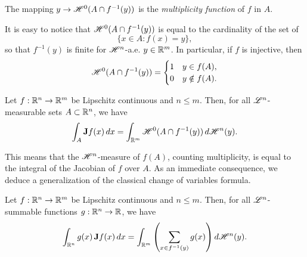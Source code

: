 \begin{definition}
The mapping $y \to \mathscr{H}^{0}(A \cap f^{-1}(y))$ is the {\em multiplicity function} of $f$ in $A$.
\end{definition}

\begin{remark}
It is easy to notice that $\mathscr{H}^{0}(A \cap f^{-1}(y))$ is equal to the cardinality of the set of $$\{ x \in A : f(x) = y \},$$
so that $f^{-1}(y)$ is finite for $\mathscr{H}^{n}$-a.e. $y \in \mathbb{R}^{m}$.
In particular, if $f$ is injective, then
\begin{equation*}
\mathscr{H}^{0}(A \cap f^{-1}(y)) = \begin{cases} 1 & y \in f(A), \\
0 & y \notin f(A).
\end{cases}
\end{equation*}
\end{remark}

\begin{theorem} \label{area_formula}
Let $f : \mathbb{R}^{n} \to \mathbb{R}^{m}$ be Lipschitz continuous and $n \le m$. Then, for all $\mathscr{L}^{n}$-measurable sets $A \subset \mathbb{R}^{n}$, we have
\begin{equation} \label{eq:area_formula}
\int_{A} {\bf J} f(x) \, dx = \int_{\mathbb{R}^{m}} \mathscr{H}^{0}(A \cap f^{-1}(y)) \, d\mathscr{H}^{n}(y).
\end{equation}
\end{theorem}

This means that the $\mathscr{H}^{n}$-measure of $f(A)$, counting multiplicity, is equal to the integral of the Jacobian of $f$ over $A$. As an immediate consequence, we deduce a generalization of the classical change of variables formula.

\begin{theorem} \label{change_variables_gen}
Let $f : \mathbb{R}^{n} \to \mathbb{R}^{m}$ be Lipschitz continuous and $n \le m$. Then, for all $\mathscr{L}^{n}$-summable functions $g : \mathbb{R}^{n} \to \mathbb{R}$, we have
\begin{equation} \label{eq:change_variables_gen}
\int_{\mathbb{R}^{n}} g(x) \, {\bf J} f(x) \, dx = \int_{\mathbb{R}^{m}} \left (\sum_{x \in f^{-1}(y)} g(x) \right ) d \mathscr{H}^{n}(y).
\end{equation}
\end{theorem}

